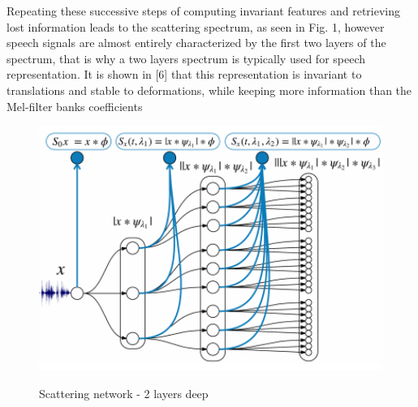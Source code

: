 Repeating these successive steps of computing invariant features and retrieving lost information leads to the scattering spectrum, as seen in Fig. 1, however speech signals are almost entirely characterized by the first two layers of the spectrum, that is why a two layers spectrum is typically used for speech representation. It is shown in [6] that this representation is invariant to translations and stable to deformations, while keeping more information than the Mel-filter banks coefficients
\begin{figure}
\centering
  \includegraphics[width=14cm]{thesis/images/scatter.png}\\
  \caption{Scattering network - 2 layers deep} \cite{zeghidour2016deep}\label{fig_4_3_scatter}
\end{figure}
